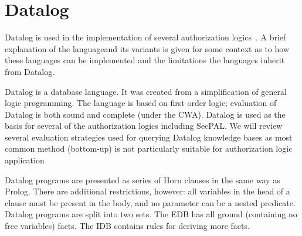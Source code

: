 \documentclass[thesis.tex]{subfiles}
\begin{document}
%

\section{Datalog}
\label{ssec:datalog}

Datalog is used in the implementation of several authorization
logics~\cite{detreville_binder_2002,li_distributed_2003,becker_secpal:_2010}. A brief explanation of the languageand its variants is given for some context as to how these languages
can be implemented and the limitations the languages inherit from
Datalog.

Datalog is a database language. It was created from a simplification
of general logic programming. The language is based on first order
logic; evaluation of Datalog is both sound and complete (under the
\ac{CWA}). Datalog is used as the basis for several of the
authorization logics including SecPAL. We will review several
evaluation strategies used for querying Datalog knowledge bases as
most common method (bottom-up) is not particularly suitable for
authorization logic application

Datalog programs are presented as series of Horn clauses in the same
way as Prolog. There are additional restrictions, however: all
variables in the head of a clause must be present in the body, and no
parameter can be a nested predicate.  Datalog programs are split into
two sets. The \ac{EDB} has all ground (containing no free variables)
facts. The \ac{IDB} contains rules for deriving more facts.
\end{document}
